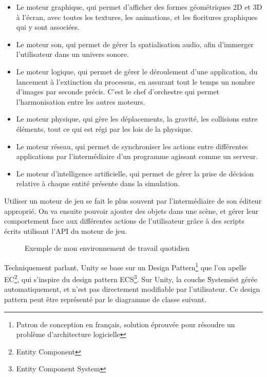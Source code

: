 \documentclass[a4paper]{article}
\begin{document}
    \begin{itemize}

        \item Le moteur graphique, qui permet d'afficher des formes géométriques 2D et 3D à l'écran, avec toutes les textures, les animations, et les fioritures graphiques qui y sont associées. \\

        \item Le moteur son, qui permet de gérer la spatialisation audio, afin d'immerger l'utilisateur dans un univers sonore. \\
 
        \item Le moteur logique, qui permet de gérer le déroulement d'une application, du lancement à l'extinction du processus, en assurant tout le temps un nombre d'images par seconde précis. C'est le chef d'orchestre qui permet l'harmonisation entre les autres moteurs. \\

        \item Le moteur physique, qui gère les déplacements, la gravité, les collisions entre éléments, tout ce qui est régi par les lois de la physique. \\

        \item Le moteur réseau, qui permet de synchroniser les actions entre différentes applications par l'intermédiaire d'un programme agissant comme un serveur. \\

        \item Le moteur d'intelligence artificielle, qui permet de gérer la prise de décision relative à chaque entité présente dans la simulation. \\
    \end{itemize}

    Utiliser un moteur de jeu se fait le plus souvent par l'intermédiaire de son éditeur approprié. On va ensuite pouvoir ajouter des objets dans une scène, et gérer leur comportement face aux différentes actions de l'utilisateur grâce à des scripts écrits utilisant l'API du moteur de jeu. \\

    \begin{figure}[H]
        \centering
        \caption{Exemple de mon environnement de travail quotidien}
    \end{figure}

    Techniquement parlant, Unity se base sur un Design Pattern\footnote{Patron de conception en français, solution éprouvée pour résoudre un problème d'architecture logicielle} que l'on apelle EC\footnote{Entity Component}, qui s'inspire du design pattern ECS\footnote{Entity Component System}. Sur Unity, la couche \"System\" est gérée automatiquement, et n'est pas directement modifiable par l'utilisateur. Ce design pattern peut être représenté par le diagramme de classe suivant. \\
\end{document}
